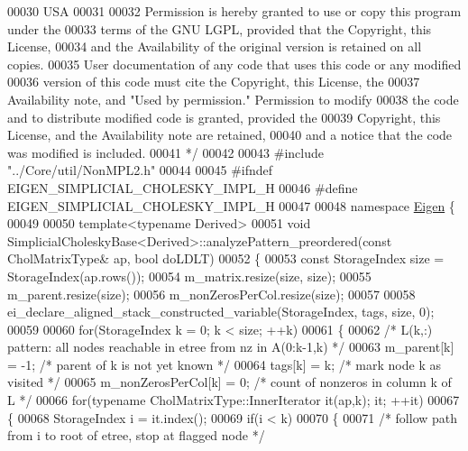 \begin{DoxyCode}
00030 \textcolor{comment}{    USA}
00031 \textcolor{comment}{}
00032 \textcolor{comment}{    Permission is hereby granted to use or copy this program under the}
00033 \textcolor{comment}{    terms of the GNU LGPL, provided that the Copyright, this License,}
00034 \textcolor{comment}{    and the Availability of the original version is retained on all copies.}
00035 \textcolor{comment}{    User documentation of any code that uses this code or any modified}
00036 \textcolor{comment}{    version of this code must cite the Copyright, this License, the}
00037 \textcolor{comment}{    Availability note, and "Used by permission." Permission to modify}
00038 \textcolor{comment}{    the code and to distribute modified code is granted, provided the}
00039 \textcolor{comment}{    Copyright, this License, and the Availability note are retained,}
00040 \textcolor{comment}{    and a notice that the code was modified is included.}
00041 \textcolor{comment}{ */}
00042 
00043 \textcolor{preprocessor}{#include "../Core/util/NonMPL2.h"}
00044 
00045 \textcolor{preprocessor}{#ifndef EIGEN\_SIMPLICIAL\_CHOLESKY\_IMPL\_H}
00046 \textcolor{preprocessor}{#define EIGEN\_SIMPLICIAL\_CHOLESKY\_IMPL\_H}
00047 
00048 \textcolor{keyword}{namespace }\hyperlink{namespace_eigen}{Eigen} \{
00049 
00050 \textcolor{keyword}{template}<\textcolor{keyword}{typename} Derived>
00051 \textcolor{keywordtype}{void} SimplicialCholeskyBase<Derived>::analyzePattern\_preordered(\textcolor{keyword}{const} CholMatrixType& ap, \textcolor{keywordtype}{bool} doLDLT)
00052 \{
00053   \textcolor{keyword}{const} StorageIndex size = StorageIndex(ap.rows());
00054   m\_matrix.resize(size, size);
00055   m\_parent.resize(size);
00056   m\_nonZerosPerCol.resize(size);
00057 
00058   ei\_declare\_aligned\_stack\_constructed\_variable(StorageIndex, tags, size, 0);
00059 
00060   \textcolor{keywordflow}{for}(StorageIndex k = 0; k < size; ++k)
00061   \{
00062     \textcolor{comment}{/* L(k,:) pattern: all nodes reachable in etree from nz in A(0:k-1,k) */}
00063     m\_parent[k] = -1;             \textcolor{comment}{/* parent of k is not yet known */}
00064     tags[k] = k;                  \textcolor{comment}{/* mark node k as visited */}
00065     m\_nonZerosPerCol[k] = 0;      \textcolor{comment}{/* count of nonzeros in column k of L */}
00066     \textcolor{keywordflow}{for}(\textcolor{keyword}{typename} CholMatrixType::InnerIterator it(ap,k); it; ++it)
00067     \{
00068       StorageIndex i = it.index();
00069       \textcolor{keywordflow}{if}(i < k)
00070       \{
00071         \textcolor{comment}{/* follow path from i to root of etree, stop at flagged node */}

\end{DoxyCode}
